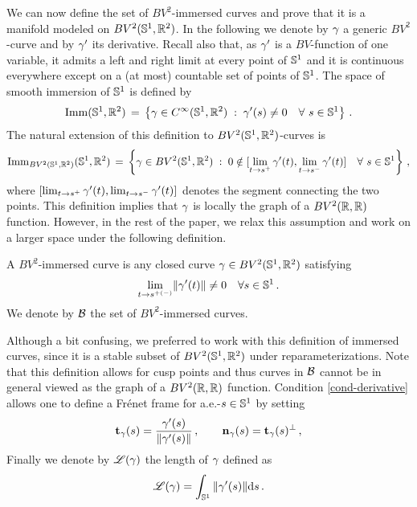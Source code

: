 We can now define the set of $BV^2$-immersed curves and prove that it is a manifold modeled on $BV^2(\mathbb{S}^1,\mathbb{R}^2)$. In the following we denote by $\gamma$ a generic $BV^2$-curve and by $\gamma'$ its derivative.
Recall also that, as $\gamma'$ is a $BV$-function of one variable, it admits a left and right limit at every point of $\mathbb{S}^1$ and it is continuous everywhere except on a (at most) countable set of  points of $\mathbb{S}^1$.
The space of smooth immersion of $\mathbb{S}^1$ is defined by
\begin{equation}\label{immersion-smooth}
	\operatorname{Imm}(\mathbb{S}^1,{\mathbb R}^2)\, = \,
	\left\{  \gamma \in C^{\infty}(\mathbb{S}^1,{\mathbb R}^2)   \;:\; 
		\gamma'(s) \neq 0 \quad \forall \, \, s \in \mathbb{S}^1  \right\}\,.
\end{equation} 
The natural extension of this definition to $BV^2(\mathbb{S}^1,\mathbb{R}^2)$-curves is 
\begin{equation}\label{immersion-BV2}
	\operatorname{Imm}_{BV^2(\mathbb{S}^1,\mathbb{R}^2)}(\mathbb{S}^1,{\mathbb R}^2)\, = \,
	\left\{ 	\gamma \in BV^2(\mathbb{S}^1,\mathbb{R}^2)   \;:\; 
		0 \notin [\lim_{t\to s^+} \gamma'(t),\lim_{t\to s^-} \gamma'(t)] \quad \forall \, \, s \in \mathbb{S}^1  \right\}\,,
\end{equation} 
where $[\lim_{t\to s^+} \gamma'(t),\lim_{t\to s^-} \gamma'(t)]$ denotes the segment connecting the two points.
This definition implies that $\gamma$ is locally the graph of a $BV^2({\mathbb R},{\mathbb R})$ function. However, in the rest of the paper, we relax this assumption and work on a larger space under the following definition.

\begin{defn}
\label{BV2curves}
A $BV^2$-immersed curve is any closed curve  $\gamma \in BV^2( \mathbb{S}^1, {\mathbb R}^2)$ satisfying
\begin{equation}\label{cond-derivative}
	\underset{t\rightarrow s^{+(-)}}{\lim} \|\gamma'(t)\| \neq 0	\quad \forall s\in\mathbb{S}^1\,.
\end{equation}
We denote by $\mathcal{B}$ the set of $BV^2$-immersed curves.  
\end{defn}
Although a bit confusing, we preferred to work with this definition of immersed curves, since it is a stable subset of $BV^2(\mathbb{S}^1,\mathbb{R}^2)$ under reparameterizations.
Note that this definition allows for cusp points and thus curves in $\mathcal{B}$ cannot be in general viewed as the graph of a $BV^2({\mathbb R},{\mathbb R})$ function.
Condition \eqref{cond-derivative} allows one to define a Fr\'enet frame for a.e.-$s\in \mathbb{S}^1$ by setting
\begin{equation}\label{def-tangente}
	{\bf t}_{\gamma}(s) = \frac{\gamma'(s)}{\|\gamma'(s)\|}\,,\quad \quad \mathbf{n}_\gamma(s)= {\bf t}_{\gamma}(s)^\bot\,,
\end{equation}
Finally we denote by $\mathscr{L}(\gamma)$  the length of $\gamma$ defined as
\begin{equation}\label{length-def}
\mathscr{L}(\gamma)=\int_{\mathbb{S}^1}\|\gamma'(s)\|\mathrm{d} s\,.
\end{equation}

